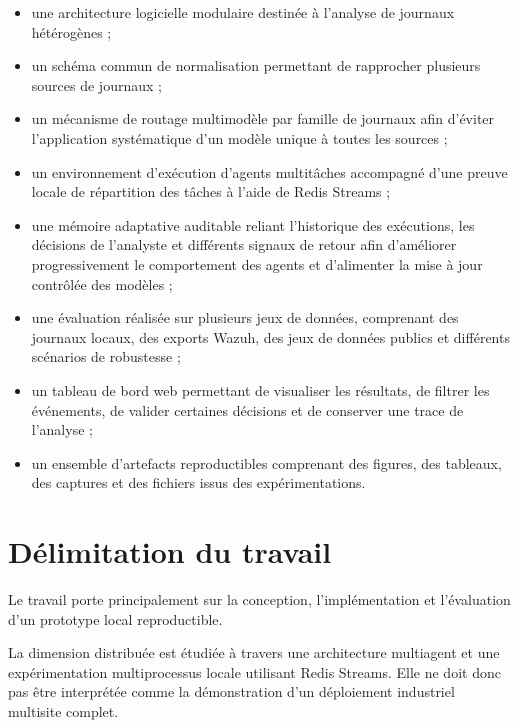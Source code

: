 \begin{itemize}

\item une architecture logicielle modulaire destinée à l'analyse de journaux hétérogènes ;

\item un schéma commun de normalisation permettant de rapprocher plusieurs sources de journaux ;

\item un mécanisme de routage multimodèle par famille de journaux afin d'éviter l'application systématique d'un modèle unique à toutes les sources ;

\item un environnement d'exécution d'agents multitâches accompagné d'une preuve locale de répartition des tâches à l'aide de Redis Streams ;

\item une mémoire adaptative auditable reliant l'historique des exécutions, les décisions de l'analyste et différents signaux de retour afin d'améliorer progressivement le comportement des agents et d'alimenter la mise à jour contrôlée des modèles ;

\item une évaluation réalisée sur plusieurs jeux de données, comprenant des journaux locaux, des exports Wazuh, des jeux de données publics et différents scénarios de robustesse ;

\item un tableau de bord web permettant de visualiser les résultats, de filtrer les événements, de valider certaines décisions et de conserver une trace de l'analyse ;

\item un ensemble d'artefacts reproductibles comprenant des figures, des tableaux, des captures et des fichiers issus des expérimentations.

\end{itemize}

\section{Délimitation du travail}

Le travail porte principalement sur la conception, l'implémentation et l'évaluation d'un prototype local reproductible.

La dimension distribuée est étudiée à travers une architecture multiagent et une expérimentation multiprocessus locale utilisant Redis Streams. Elle ne doit donc pas être interprétée comme la démonstration d'un déploiement industriel multisite complet.

